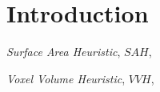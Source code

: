 \chapter{Introduction}



\citealp{275461}








\textit{Surface Area Heuristic}, $SAH$, 

\textit{Voxel Volume Heuristic}, $VVH$,

